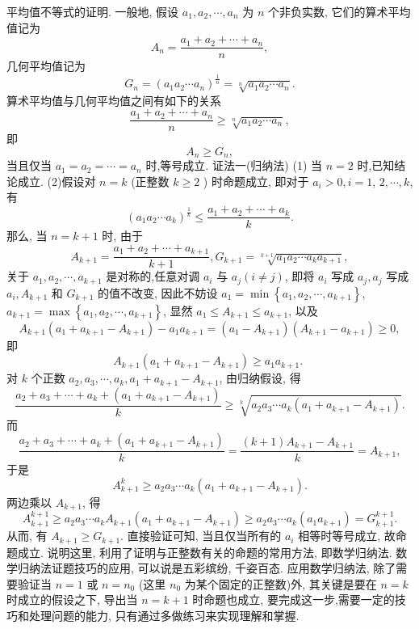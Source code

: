 平均值不等式的证明.
一般地, 假设 $a_1, a_2, \cdots, a_n$ 为 $n$ 个非负实数, 它们的算术平均值记为
$$
A_n=\frac{a_1+a_2+\cdots+a_n}{n},
$$
几何平均值记为
$$
G_n=\left(a_1 a_2 \cdots a_n\right)^{\frac{1}{n}}=\sqrt[n]{a_1 a_2 \cdots a_n} .
$$
算术平均值与几何平均值之间有如下的关系
$$
\frac{a_1+a_2+\cdots+a_n}{n} \geqslant \sqrt[n]{a_1 a_2 \cdots a_n},
$$
即
$$
A_n \geqslant G_n,
$$
当且仅当 $a_1=a_2=\cdots=a_n$ 时,等号成立.
证法一(归纳法)
(1) 当 $n=2$ 时,已知结论成立.
(2)假设对 $n=k$ (正整数 $k \geqslant 2$ ) 时命题成立, 即对于 $a_i>0, i=1$, $2, \cdots, k$, 有
$$
\left(a_1 a_2 \cdots a_k\right)^{\frac{1}{k}} \leqslant \frac{a_1+a_2+\cdots+a_k}{k} .
$$
那么, 当 $n=k+1$ 时, 由于
$$
A_{k+1}=\frac{a_1+a_2+\cdots+a_{k+1}}{k+1}, G_{k+1}=\sqrt[k+1]{a_1 a_2 \cdots a_k a_{k+1}},
$$
关于 $a_1, a_2, \cdots, a_{k+1}$ 是对称的,任意对调 $a_i$ 与 $a_j(i \neq j)$, 即将 $a_i$ 写成 $a_j, a_j$ 写成 $a_i, A_{k+1}$ 和 $G_{k+1}$ 的值不改变, 因此不妨设 $a_1=\min \left\{a_1, a_2, \cdots, a_{k+1}\right\}$, $a_{k+1}=\max \left\{a_1, a_2, \cdots, a_{k+1}\right\}$, 显然 $a_1 \leqslant A_{k+1} \leqslant a_{k+1}$, 以及
$$
A_{k+1}\left(a_1+a_{k+1}-A_{k+1}\right)-a_1 a_{k+1}=\left(a_1-A_{k+1}\right)\left(A_{k+1}-a_{k+1}\right) \geqslant 0,
$$
即
$$
A_{k+1}\left(a_1+a_{k+1}-A_{k+1}\right) \geqslant a_1 a_{k+1} \text {. }
$$
对 $k$ 个正数 $a_2, a_3, \cdots, a_k, a_1+a_{k+1}-A_{k+1}$, 由归纳假设, 得
$$
\frac{a_2+a_3+\cdots+a_k+\left(a_1+a_{k+1}-A_{k+1}\right)}{k} \geqslant \sqrt[k]{a_2 a_3 \cdots a_k\left(a_1+a_{k+1}-A_{k+1}\right)} .
$$
而
$$
\frac{a_2+a_3+\cdots+a_k+\left(a_1+a_{k+1}-A_{k+1}\right)}{k}=\frac{(k+1) A_{k+1}-A_{k+1}}{k}=A_{k+1},
$$
于是
$$
A_{k+1}^k \geqslant a_2 a_3 \cdots a_k\left(a_1+a_{k+1}-A_{k+1}\right) .
$$
两边乘以 $A_{k+1}$, 得
$$
A_{k+1}^{k+1} \geqslant a_2 a_3 \cdots a_k A_{k+1}\left(a_1+a_{k+1}-A_{k+1}\right) \geqslant a_2 a_3 \cdots a_k\left(a_1 a_{k+1}\right)=G_{k+1}^{k+1} .
$$
从而, 有 $A_{k+1} \geqslant G_{k+1}$.
直接验证可知, 当且仅当所有的 $a_i$ 相等时等号成立, 故命题成立.
说明这里, 利用了证明与正整数有关的命题的常用方法, 即数学归纳法.
数学归纳法证题技巧的应用, 可以说是五彩缤纷, 千姿百态.
应用数学归纳法, 除了需要验证当 $n=1$ 或 $n=n_0$ (这里 $n_0$ 为某个固定的正整数)外, 其关键是要在 $n=k$ 时成立的假设之下, 导出当 $n=k+1$ 时命题也成立, 要完成这一步,需要一定的技巧和处理问题的能力, 只有通过多做练习来实现理解和掌握.



